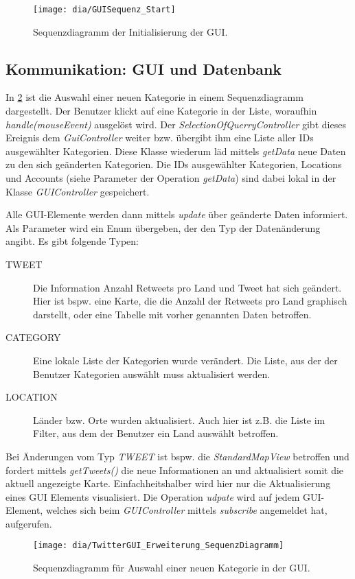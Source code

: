 \begin{figure}[h!]
	\centering
	\texttt{[image: dia/GUISequenz\_Start]}
	\caption{Sequenzdiagramm der Initialisierung der GUI.}
	\label{fig:GUIStartSeq}
\end{figure}
\subsection{Kommunikation: GUI und Datenbank}
In \cref{fig:GUISeq} ist die Auswahl einer neuen Kategorie in einem Sequenzdiagramm dargestellt. Der Benutzer klickt auf eine Kategorie in der Liste, woraufhin \emph{handle(mouseEvent)} ausgelöst wird. Der \emph{SelectionOfQuerryController} gibt dieses Ereignis dem \emph{GuiController} weiter bzw. übergibt ihm eine Liste aller IDs ausgewählter Kategorien. Diese Klasse wiederum läd mittels \emph{getData} neue Daten zu den sich geänderten Kategorien. Die IDs ausgewählter Kategorien, Locations und Accounts (siehe Parameter der Operation \emph{getData}) sind dabei lokal in der Klasse \emph{GUIController} gespeichert.

Alle GUI-Elemente werden dann mittels \emph{update} über geänderte Daten informiert. Als Parameter wird ein Enum übergeben, der den Typ der Datenänderung angibt. Es gibt folgende Typen:
\begin{description}
	\item[TWEET] Die Information Anzahl Retweets pro Land und Tweet hat sich geändert. Hier ist bspw. eine Karte, die die Anzahl der Retweets pro Land graphisch darstellt, oder eine Tabelle mit vorher genannten Daten betroffen. 
	\item[CATEGORY] Eine lokale Liste der Kategorien wurde verändert. Die Liste, aus der der Benutzer Kategorien auswählt muss aktualisiert werden.
	\item[LOCATION] Länder bzw. Orte wurden aktualisiert. Auch hier ist z.B. die Liste im Filter, aus dem der Benutzer ein Land auswählt betroffen.
\end{description}
Bei Änderungen vom Typ \emph{TWEET} ist bspw. die \emph{StandardMapView} betroffen und fordert mittels \emph{getTweets()} die neue Informationen an und aktualisiert somit die aktuell angezeigte Karte. Einfachheitshalber wird hier nur die Aktualisierung eines GUI Elements visualisiert. Die Operation \emph{udpate} wird auf jedem GUI-Element, welches sich beim \emph{GUIController} mittels \emph{subscribe} angemeldet hat, aufgerufen.
\begin{figure}[h!]
	\centering
	\texttt{[image: dia/TwitterGUI\_Erweiterung\_SequenzDiagramm]}
	\caption{Sequenzdiagramm für Auswahl einer neuen Kategorie in der GUI.}
	\label{fig:GUISeq}
\end{figure}
